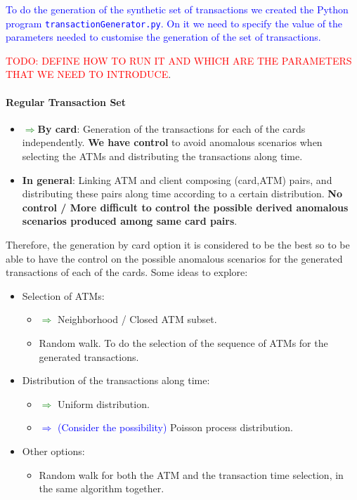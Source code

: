 \documentclass{article}
\begin{document}
\textcolor{blue}{To do the generation of the synthetic set of transactions we created the Python program \texttt{transactionGenerator.py}. On it we need to specify the value of the parameters needed to customise the generation of the set of transactions.}

\textcolor{red}{TODO: DEFINE HOW TO RUN IT AND WHICH ARE THE PARAMETERS THAT WE NEED TO INTRODUCE}.

\paragraph{Regular Transaction Set\\}

\begin{tcolorbox}
  \begin{itemize}
    \item \textcolor{green}{$\Rightarrow$}\textbf{By card}: Generation of the transactions for each of the cards independently. \textbf{We have
    control} to avoid anomalous scenarios when selecting the ATMs and distributing the transactions along time.
    \item \textbf{In general}: Linking ATM and client composing (card,ATM) pairs, and distributing these pairs along
    time according to a certain distribution. \textbf{No control / More difficult to control the possible derived
    anomalous scenarios produced among same card pairs}.
  \end{itemize}
\end{tcolorbox}

Therefore, the generation by card option it is considered to be the best so to be able to have the control
on the possible anomalous scenarios for the generated transactions of each of the cards. Some ideas to explore:

\begin{itemize}
  \item Selection of ATMs:
  \begin{itemize}
    \item \textcolor{green}{$\Rightarrow$} Neighborhood / Closed ATM subset.
    \item Random walk. To do the selection of the sequence of ATMs for the generated transactions.
  \end{itemize}
  \item Distribution of the transactions along time:
  \begin{itemize}
    \item \textcolor{green}{$\Rightarrow$} Uniform distribution.
    \item \textcolor{blue}{$\Rightarrow$ (Consider the possibility)} Poisson process distribution.
  \end{itemize}
  \item Other options:
  \begin{itemize}
    \item Random walk for both the ATM and the transaction time selection, in the same algorithm together.
  \end{itemize}
\end{itemize}
\end{document}
